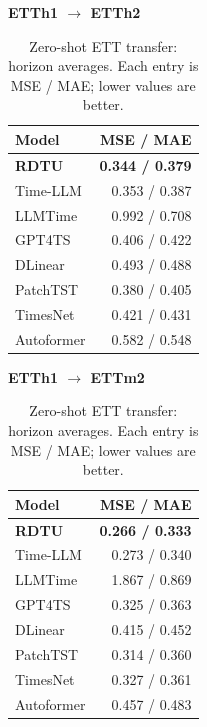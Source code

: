 \begin{table}[H]\centering\small
\caption{Zero-shot ETT transfer: horizon averages. Each entry is MSE / MAE; lower values are better.}\label{tab:zero-shot-forecasting-brief}
\begin{minipage}[t]{0.48\linewidth}\vspace{0pt}\centering\small
\textbf{ETTh1 $\to$ ETTh2}\par\smallskip
\begin{tabular}{lr}\toprule Model & MSE / MAE\\\midrule
\rowcolor{blue!5}
\textbf{RDTU} & \textbf{0.344 / 0.379}\\
Time-LLM & 0.353 / 0.387\\
LLMTime & 0.992 / 0.708\\
GPT4TS & 0.406 / 0.422\\
DLinear & 0.493 / 0.488\\
PatchTST & 0.380 / 0.405\\
TimesNet & 0.421 / 0.431\\
Autoformer & 0.582 / 0.548\\
\bottomrule\end{tabular}\end{minipage}\hfill\begin{minipage}[t]{0.48\linewidth}\vspace{0pt}\centering\small
\textbf{ETTh1 $\to$ ETTm2}\par\smallskip
\begin{tabular}{lr}\toprule Model & MSE / MAE\\\midrule
\rowcolor{blue!5}
\textbf{RDTU} & \textbf{0.266 / 0.333}\\
Time-LLM & 0.273 / 0.340\\
LLMTime & 1.867 / 0.869\\
GPT4TS & 0.325 / 0.363\\
DLinear & 0.415 / 0.452\\
PatchTST & 0.314 / 0.360\\
TimesNet & 0.327 / 0.361\\
Autoformer & 0.457 / 0.483\\
\bottomrule\end{tabular}\end{minipage}
\end{table}

